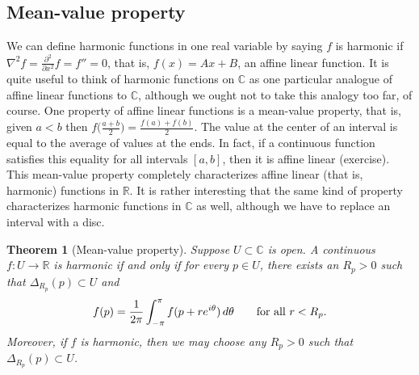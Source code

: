 \documentclass[12pt,openany]{book}
\newcommand{\avoidbreak}{\postdisplaypenalty=100}
\newcommand{\C}{{\mathbb{C}}}
\newcommand{\R}{{\mathbb{R}}}
\theoremstyle{plain}
\newtheorem{thm}{Theorem}[section]
\theoremstyle{remark}
\theoremstyle{definition}
\theoremstyle{exercise}
\theoremstyle{example}
\begin{document}
\subsection{Mean-value property}

We can define harmonic functions in one real variable
by saying $f$ is harmonic if
$\nabla^2 f = \frac{\partial^2}{\partial x^2} f = f'' = 0$, that is, $f(x) = Ax+B$, an affine
linear function.  It is quite useful to think of harmonic functions on $\C$ as one
particular analogue of affine linear functions to $\C$, although we ought
not to take this analogy too far, of course.
One property of affine linear functions is a mean-value property, that is,
given $a < b$ then $f\bigl(\frac{a+b}{2}\bigr) = \frac{f(a)+f(b)}{2}$.  The
value at the center of an interval is equal to the average of values at the
ends.  In fact, if a continuous function satisfies this equality for all
intervals $[a,b]$, then it is
affine linear (exercise).  This mean-value property completely characterizes affine
linear (that is, harmonic) functions in $\R$.
It is rather interesting that the same kind of property characterizes
harmonic functions in $\C$ as well, although we have to replace an interval
with a disc.

\begin{thm}[Mean-value property]\label{thm:meanprop}
\pagebreak[0]
Suppose $U \subset \C$ is open.
A continuous 
$f \colon U \to \R$
is harmonic if and only if for every $p \in U$, there exists an $R_p >0$
such that $\Delta_{R_p}(p) \subset U$ and
\begin{equation*}
f(p) = \frac{1}{2\pi} \int_{-\pi}^{\pi} f(p+re^{i\theta})\, d\theta
\qquad \text{for all } r < R_p .
\avoidbreak
\end{equation*}
Moreover, if $f$ is harmonic, then we may choose any
$R_p > 0$ such that $\Delta_{R_p}(p) \subset U$.
\end{thm}
\end{document}
